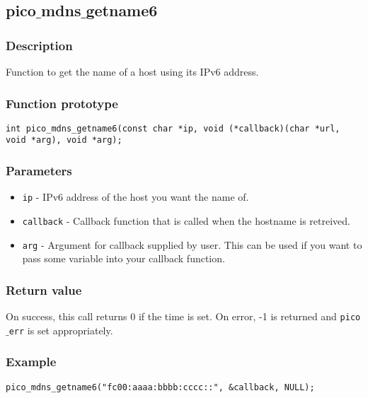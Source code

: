 \subsection{pico$\_$mdns$\_$getname6}

\subsubsection*{Description}
Function to get the name of a host using its IPv6 address.

\subsubsection*{Function prototype}
\begin{verbatim}
int pico_mdns_getname6(const char *ip, void (*callback)(char *url, void *arg), void *arg);
\end{verbatim}

\subsubsection*{Parameters}
\begin{itemize}[noitemsep]
\item \texttt{ip} - IPv6 address of the host you want the name of.
\item \texttt{callback} - Callback function that is called when the hostname is retreived.
\item \texttt{arg} - Argument for callback supplied by user. This can be used if you want to pass some variable into your callback function.
\end{itemize}

\subsubsection*{Return value}
On success, this call returns 0 if the time is set.
On error, -1 is returned and \texttt{pico$\_$err} is set appropriately.

\subsubsection*{Example}
\begin{verbatim}
pico_mdns_getname6("fc00:aaaa:bbbb:cccc::", &callback, NULL);
\end{verbatim}
